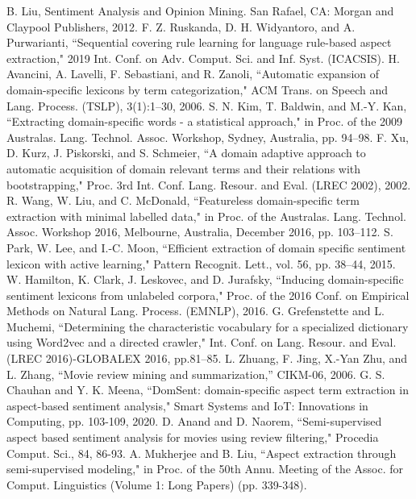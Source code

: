 \documentclass[a4paper,conference]{IEEEtran}
\begin{document}
\begin{thebibliography}{00}
 B. Liu, Sentiment Analysis and Opinion Mining. San Rafael, CA: Morgan and Claypool Publishers, 2012.
 F. Z. Ruskanda, D. H. Widyantoro, and A. Purwarianti, ``Sequential covering rule learning for language rule-based aspect extraction," 2019 Int. Conf. on Adv. Comput. Sci. and Inf. Syst. (ICACSIS).
 H. Avancini, A. Lavelli, F. Sebastiani, and R. Zanoli, ``Automatic expansion of domain-specific lexicons by term categorization," ACM Trans. on Speech and Lang. Process. (TSLP), 3(1):1–30, 2006.
 S. N. Kim, T. Baldwin, and M.-Y. Kan, ``Extracting domain-specific words - a statistical approach," in Proc. of the 2009 Australas. Lang. Technol. Assoc. Workshop, Sydney, Australia, pp. 94–98.
 F. Xu, D. Kurz, J. Piskorski, and S. Schmeier, ``A domain adaptive approach to automatic acquisition of domain relevant terms and their relations with bootstrapping," Proc. 3rd Int. Conf. Lang. Resour. and Eval. (LREC 2002), 2002.
 R. Wang, W. Liu, and C. McDonald, ``Featureless domain-specific term extraction with minimal labelled data," in Proc. of the Australas. Lang. Technol. Assoc. Workshop 2016, Melbourne, Australia, December 2016, pp. 103–112.
 S. Park, W. Lee, and I.-C. Moon, ``Efficient extraction of domain specific sentiment lexicon with active learning," Pattern Recognit. Lett., vol. 56, pp. 38–44, 2015.
 W. Hamilton, K. Clark, J. Leskovec, and D. Jurafsky, ``Inducing domain-specific sentiment lexicons from unlabeled corpora," Proc. of the 2016 Conf. on Empirical Methods on Natural Lang. Process. (EMNLP), 2016.
 G. Grefenstette and L. Muchemi, ``Determining the characteristic vocabulary for a specialized dictionary using Word2vec and a directed crawler," Int. Conf. on Lang. Resour. and Eval. (LREC 2016)-GLOBALEX 2016, pp.81–85.
 L. Zhuang, F. Jing, X.-Yan Zhu, and L. Zhang, “Movie review mining and summarization,” CIKM-06, 2006.
 G. S. Chauhan and Y. K. Meena, ``DomSent: domain-specific aspect term extraction in aspect-based sentiment analysis," Smart Systems and IoT: Innovations in Computing, pp. 103-109, 2020.
 D. Anand and D. Naorem, ``Semi-supervised aspect based sentiment analysis for movies using review filtering," Procedia Comput. Sci., 84, 86-93.
 A. Mukherjee and B. Liu, ``Aspect extraction through semi-supervised modeling," in Proc. of the 50th Annu. Meeting of the Assoc. for Comput. Linguistics (Volume 1: Long Papers) (pp. 339-348).

\end{thebibliography}
\end{document}
